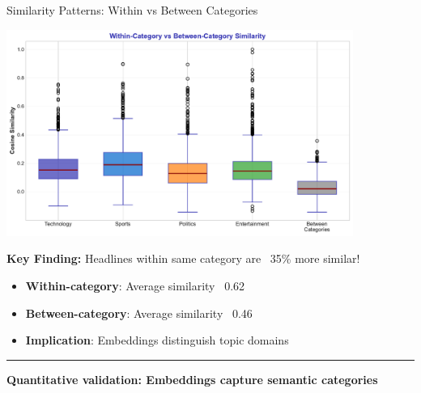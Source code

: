 \documentclass[8pt,aspectratio=169]{beamer}
\newcommand{\bottomnote}[1]{%
\vfill
\vspace{-2mm}
\textcolor{mllavender2}{\rule{\textwidth}{0.4pt}}
\vspace{1mm}
\footnotesize
\textbf{#1}
}
\begin{document}
\begin{frame}[t]{Similarity Patterns: Within vs Between Categories}

\begin{center}
\includegraphics[width=0.85\textwidth,height=0.65\textheight]{charts/similarity_distribution.pdf}
\end{center}

\vspace{0.2cm}

\textbf{Key Finding:} Headlines within same category are ~35\% more similar!

\begin{itemize}
    \item \textbf{Within-category}: Average similarity ~0.62
    \item \textbf{Between-category}: Average similarity ~0.46
    \item \textbf{Implication}: Embeddings distinguish topic domains
\end{itemize}

\bottomnote{Quantitative validation: Embeddings capture semantic categories}
\end{frame}
\end{document}
